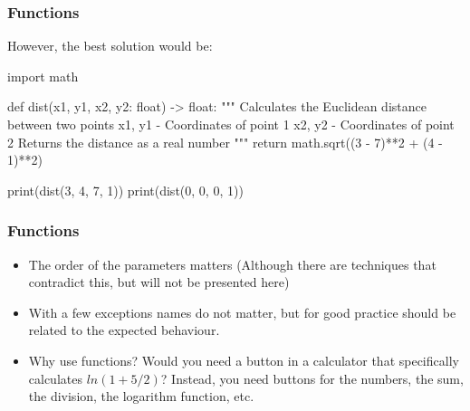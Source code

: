 \documentclass{beamer}
\begin{document}
\begin{frame}[containsverbatim]
    \frametitle{Functions}
    However, the best solution would be:
    \begin{pythonlst}
        import math

        def dist(x1, y1, x2, y2: float) -> float:
            """ Calculates the Euclidean distance between two points
                x1, y1 - Coordinates of point 1
                x2, y2 - Coordinates of point 2
                Returns the distance as a real number """
            return math.sqrt((3 - 7)**2 + (4 - 1)**2)
        
        print(dist(3, 4, 7, 1))
        print(dist(0, 0, 0, 1))
    \end{pythonlst}
\end{frame}

\begin{frame}
    \frametitle{Functions}
    \begin{itemize}
        \item The order of the parameters matters (Although there are techniques
        that contradict this, but will not be presented here)
        \item With a few exceptions names do not matter, but for good practice
        should be related to the expected behaviour.
        \item Why use functions? Would you need a button in a calculator that 
        specifically calculates $ln(1+5/2)$? Instead, you need buttons for 
        the numbers, the sum, the division, the logarithm function, etc.
    \end{itemize}
\end{frame}


\end{document}
